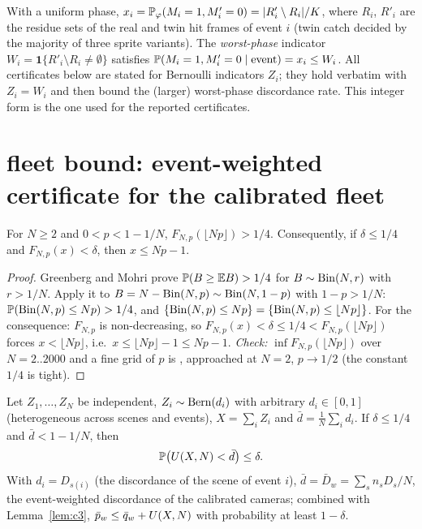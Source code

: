 \begin{remark}
With a uniform phase, $x_i=\mathbb{P}_\varphi(M_i=1,M'_i=0)=|R'_i\setminus R_i|/K$, where $R_i$, $R'_i$ are the residue
sets of the real and twin hit frames of event $i$ (twin catch decided by the majority of three sprite variants).
The \emph{worst-phase} indicator $W_i=\mathbf{1}\{R'_i\setminus R_i\neq\emptyset\}$ satisfies
$\mathbb{P}(M_i=1,M'_i=0\mid\text{event})=x_i\le W_i$. All certificates below are stated for Bernoulli indicators
$Z_i$; they hold verbatim with $Z_i=W_i$ and then bound the (larger) worst-phase discordance rate. This integer
form is the one used for the reported certificates.
\end{remark}

\section{fleet bound: event-weighted certificate for the calibrated fleet}

\begin{lemma}\label{lem:mm}
For $N\ge 2$ and $0<p<1-1/N$, $F_{N,p}(\lfloor Np\rfloor)>1/4$. Consequently, if $\delta\le 1/4$ and
$F_{N,p}(x)<\delta$, then $x\le Np-1$.
\end{lemma}

\begin{proof}
Greenberg and Mohri \cite{greenberg2014} prove $\mathbb{P}(B\ge\mathbb{E} B)>1/4$ for $B\sim\mathrm{Bin}(N,r)$ with $r>1/N$. Apply it to
$B=N-\mathrm{Bin}(N,p)\sim\mathrm{Bin}(N,1-p)$ with $1-p>1/N$: $\mathbb{P}(\mathrm{Bin}(N,p)\le Np)>1/4$, and $\{\mathrm{Bin}(N,p)\le Np\}=\{\mathrm{Bin}(N,p)\le\lfloor Np\rfloor\}$.
For the consequence: $F_{N,p}$ is non-decreasing, so $F_{N,p}(x)<\delta\le1/4<F_{N,p}(\lfloor Np\rfloor)$ forces
$x<\lfloor Np\rfloor$, i.e.\ $x\le\lfloor Np\rfloor-1\le Np-1$.
\emph{Check:} $\inf F_{N,p}(\lfloor Np\rfloor)$ over $N=2..2000$ and a fine grid of $p$ is \numLemmaMin, approached at
$N=2$, $p\to1/2$ (the constant $1/4$ is tight).
\end{proof}

\begin{theorem}\label{thm:fleet}
Let $Z_1,\dots,Z_N$ be independent, $Z_i\sim\mathrm{Bern}(d_i)$ with arbitrary $d_i\in[0,1]$ (heterogeneous across scenes and
events), $X=\sum_iZ_i$ and $\bar d=\frac1N\sum_id_i$. If $\delta\le1/4$ and $\bar d<1-1/N$, then
\[\mathbb{P}\bigl(U(X,N)<\bar d\bigr)\le\delta .\]
With $d_i=D_{s(i)}$ (the discordance of the scene of event $i$), $\bar d=\bar D_w=\sum_sn_sD_s/N$, the
event-weighted discordance of the calibrated cameras; combined with Lemma~\ref{lem:c3},
$\bar p_w\le\bar q_w+U(X,N)$ with probability at least $1-\delta$.
\end{theorem}

